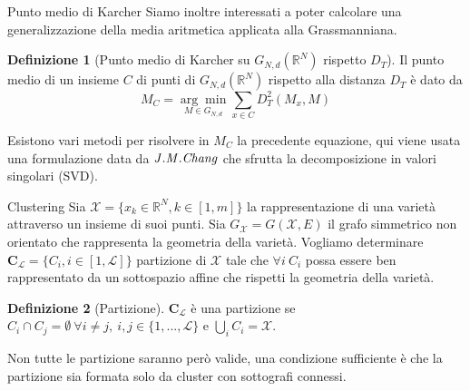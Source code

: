 \documentclass[usenames,dvipsnames,9pt]{beamer}
\newcommand{\RR}{\mathbb{R}}
\theoremstyle{definition}
\newtheorem{deff}{Definizione}
\begin{document}
\begin{frame}{Punto medio di Karcher}
Siamo inoltre interessati a poter calcolare una generalizzazione della media aritmetica applicata alla Grassmanniana.
\begin{deff}[Punto medio di Karcher su $G_{N,d}(\RR^{N})$ rispetto $D_T$]
Il punto medio di un insieme $C$ di punti di $G_{N,d}(\RR^{N})$ rispetto alla distanza $D_T$ è dato da
\begin{equation*}
M_{C}=\underset{M \in G_{N, d}}{\arg \min } \sum_{x \in C} D_{T}^{2}\left(M_{x}, M\right)
\end{equation*}
\end{deff}
Esistono vari metodi per risolvere in $M_C$ la precedente equazione, qui viene usata una formulazione data da $\it{J.M. Chang}$ che sfrutta la decomposizione in valori singolari (SVD).
\end{frame}

\begin{frame}{Clustering}
Sia $\mathcal{X} = \{x_k\in\RR^N, k\in [1, m]\}$ la rappresentazione di una varietà attraverso un insieme di suoi punti. Sia $G_{\mathcal{X}}=G(\mathcal{X}, E)$ il grafo simmetrico non orientato che rappresenta la geometria della varietà. Vogliamo determinare $\textbf{C}_{\mathcal{L}}=\{C_i, i\in [1, \mathcal{L}]\}$ partizione di $\mathcal{X}$ tale che $\forall i\ C_i$ possa essere ben rappresentato da un sottospazio affine che rispetti la geometria della varietà.
\begin{deff}[Partizione]
$\textbf{C}_{\mathcal{L}}$ è una partizione se \\ $C_i\cap C_j = \emptyset \ \forall i\neq j, \ i,j\in \{1, ..., \mathcal{L} \}$ e $\bigcup_{i} C_i = \mathcal{X}$.
\end{deff}
Non tutte le partizione saranno però valide, una condizione sufficiente è che la partizione sia formata solo da cluster con sottografi connessi.
\end{frame}
\end{document}
